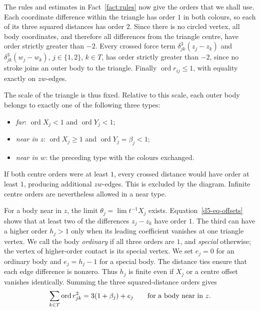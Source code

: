 \documentclass[11pt]{amsart}
\theoremstyle{definition}
\theoremstyle{remark}
\newcommand{\ord}{\operatorname{ord}}
\begin{document}
{The rules and estimates in Fact~\ref{fact:rules} now give the orders that we
shall use.  Each coordinate difference within the triangle has order $1$ in
both colours, so each of its three squared distances has order $2$.
Since there is no circled vertex, all body coordinates, and therefore all
differences from the triangle centre, have order strictly greater than $-2$.
Every crossed
force term $\delta_{jk}^3(z_j-z_k)$ and $\delta_{jk}^3(w_j-w_k)$, $j\in\{1,2\}$,
$k\in T$, has order strictly greater than $-2$, since no stroke joins an outer
body to the triangle.  Finally $\ord r_{ij}\le1$, with equality exactly on
$zw$-edges.

The scale of the triangle is thus fixed.  Relative to this scale, each outer
body belongs to exactly one of the following three types:
\begin{itemize}
 \item \emph{far}: $\ord X_j<1$ and $\ord Y_j<1$;
 \item \emph{near in $z$}: $\ord X_j\ge1$ and $\ord Y_j=\beta_j<1$;
 \item \emph{near in $w$}: the preceding type with the colours exchanged.
\end{itemize}
If both centre orders were at least $1$, every crossed distance would have
order at least $1$, producing additional $zw$-edges.  This is excluded by the
diagram.  Infinite centre orders are nevertheless allowed in a near type.

For a body near in $z$, the limit $\theta_j=\lim t^{-1}X_j$ exists.
Equation~\eqref{d5-eq-offsets} shows that at least two of the differences
$z_j-z_k$ have order $1$.  The third can have a higher order $h_j>1$ only
when its leading coefficient vanishes at one triangle vertex.  We call the
body \emph{ordinary} if all three orders are $1$, and \emph{special}
otherwise; the vertex of higher-order contact is its special vertex.
We set $e_j=0$ for an ordinary body and $e_j=h_j-1$ for a special body.
The distance ties ensure that each edge difference is nonzero.  Thus $h_j$
is finite even if $X_j$ or a centre offset vanishes identically.  Summing
the three squared-distance orders gives
\begin{equation}\label{d5-eq-near-sum}
 \sum_{k\in T}\ord r_{jk}^2=3(1+\beta_j)+e_j
 \qquad\hbox{for a body near in }z.
\end{equation}

}
\end{document}
